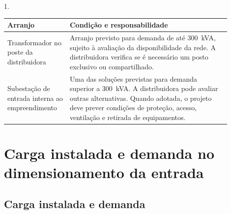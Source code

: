 \par\smallskip\noindent
\begin{minipage}{\linewidth}
  \centering
  \begin{Spacing}{1.}
    \label{qua:subestacoes-responsabilidades}
  \end{Spacing}
  \vspace{0.7\baselineskip}
  {\small
  \renewcommand{\arraystretch}{1.2}
  \setlength{\tabcolsep}{4pt}
  \begin{tabular}{|>{\raggedright\arraybackslash}p{0.25\linewidth}|>{\raggedright\arraybackslash}p{0.65\linewidth}|}
    \hline
    \textbf{Arranjo} & \textbf{Condição e responsabilidade} \\\hline
    Transformador no poste da distribuidora & Arranjo previsto para demanda de até 300~kVA, sujeito à avaliação da disponibilidade da rede. A distribuidora verifica se é necessário um posto exclusivo ou compartilhado. \\\hline
    Subestação de entrada interna ao empreendimento & Uma das soluções previstas para demanda superior a 300~kVA. A distribuidora pode avaliar outras alternativas. Quando adotada, o projeto deve prever condições de proteção, acesso, ventilação e retirada de equipamentos. \\\hline
  \end{tabular}}
\end{minipage}\par\smallskip

\section{Carga instalada e demanda no dimensionamento da entrada}
\label{sec:demandas}

\subsection{Carga instalada e demanda}


